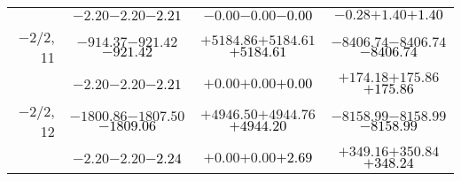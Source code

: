 \documentclass[compress]{beamer}
\begin{document}
\begin{frame}
{\begin{tabular}{r | c | c | c}
           & $-2.20$\hspace{0.1 cm}$-2.20$\hspace{0.1 cm}\textcolor{black}{$-2.21$} & $-0.00$\hspace{0.1 cm}$-0.00$\hspace{0.1 cm}\textcolor{black}{$-0.00$} & $-0.28$\hspace{0.1 cm}$+1.40$\hspace{0.1 cm}\textcolor{black}{$+1.40$} \\
$-$2/2, 11 & $-914.37$\hspace{0.1 cm}$-921.42$\hspace{0.1 cm}\textcolor{black}{$-921.42$} & $+5184.86$\hspace{0.1 cm}$+5184.61$\hspace{0.1 cm}\textcolor{black}{$+5184.61$} & $-8406.74$\hspace{0.1 cm}$-8406.74$\hspace{0.1 cm}\textcolor{black}{$-8406.74$} \\
           & $-2.20$\hspace{0.1 cm}$-2.20$\hspace{0.1 cm}\textcolor{black}{$-2.21$} & $+0.00$\hspace{0.1 cm}$+0.00$\hspace{0.1 cm}\textcolor{black}{$+0.00$} & $+174.18$\hspace{0.1 cm}$+175.86$\hspace{0.1 cm}\textcolor{black}{$+175.86$} \\
$-$2/2, 12 & $-1800.86$\hspace{0.1 cm}$-1807.50$\hspace{0.1 cm}\textcolor{black}{$-1809.06$} & $+4946.50$\hspace{0.1 cm}$+4944.76$\hspace{0.1 cm}\textcolor{black}{$+4944.20$} & $-8158.99$\hspace{0.1 cm}$-8158.99$\hspace{0.1 cm}\textcolor{black}{$-8158.99$} \\
           & $-2.20$\hspace{0.1 cm}$-2.20$\hspace{0.1 cm}\textcolor{black}{$-2.24$} & $+0.00$\hspace{0.1 cm}$+0.00$\hspace{0.1 cm}\textcolor{black}{$+2.69$} & $+349.16$\hspace{0.1 cm}$+350.84$\hspace{0.1 cm}\textcolor{black}{$+348.24$} \\
\end{tabular}}
\end{frame}
\end{document}
